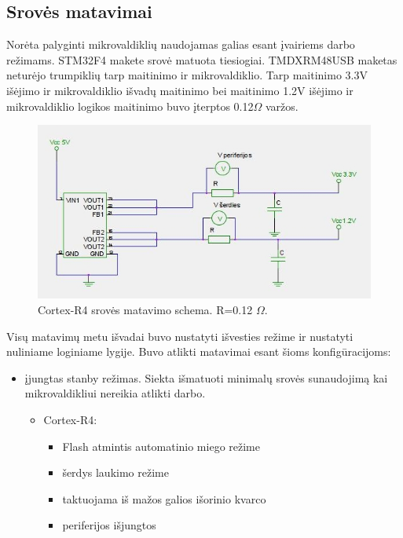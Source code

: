 \documentclass[a4paper, 12pt]{article} %
\begin{document}
\begin{onehalfspacing}
\subsection{Srov\.es matavimai}
Nor\.{e}ta palyginti mikrovaldikli\k{u} naudojamas galias esant \k{i}vairiems darbo re\v{z}imams.
STM32F4 makete srov\.e matuota tiesiogiai. TMDXRM48USB maketas netur\.ejo 
trumpikli\k{u} tarp maitinimo ir mikrovaldiklio. Tarp maitinimo 3.3V i\v{s}\.ejimo ir mikrovaldiklio i\v{s}vad\k{u} maitinimo bei maitinimo 1.2V i\v{s}\.ejimo ir mikrovaldiklio logikos maitinimo buvo \k{i}terptos 0.12$\Omega$ var\v{z}os. 
\begin{figure}[H] %
\centering %
\includegraphics[scale=0.8]{pav/srovesc.jpeg} %
\captionsetup{labelformat=numbfirst} %
\captionsetup{labelseparator=tarpas}
\caption{Cortex-R4 srov\.{e}s matavimo schema. R=0.12 $\Omega$.}
\label{vienas}
\end{figure}
Vis\k{u} matavim\k{u} metu 
  i\v{s}vadai buvo nustatyti i\v{s}vesties re\v{z}ime ir 
  nustatyti nuliniame loginiame lygije. Buvo atlikti matavimai
  esant \v{s}ioms konfig\={u}racijoms:
\begin{itemize}
\item \k{i}jungtas stanby re\v{z}imas. Siekta i\v{s}matuoti minimal\k{u} srov\.{e}s sunaudojim\k{a} kai mikrovaldikliui nereikia atlikti darbo. 
\begin{itemize} 
\item Cortex-R4:
\begin{itemize}
\item Flash atmintis automatinio miego re\v{z}ime
\item \v{s}erdys laukimo re\v{z}ime
\item taktuojama i\v{s} ma\v{z}os galios i\v{s}orinio kvarco 
\item periferijos i\v{s}jungtos
\end{itemize}


\end{itemize}
\end{itemize}
\end{onehalfspacing}
\end{document}
